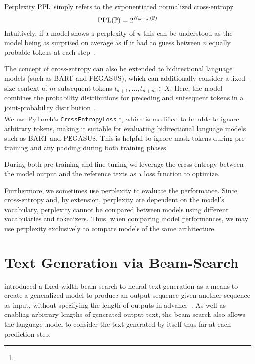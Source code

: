 Perplexity \(\operatorname{PPL}\) simply refers to the exponentiated normalized cross-entropy
\begin{equation}
\operatorname{PPL}(\mathbb{P}) = 2^{H_\text{norm.}(\mathbb{P})}
\end{equation}
Intuitively, if a model shows a perplexity of \(n\) this can be understood
as the model being as surprised on average as if it had
to guess between \(n\) equally probable tokens at each step~\parencite[78]{statistical_nlp}.

The concept of cross-entropy can also be extended to bidirectional language models (such as BART and PEGASUS),
which can additionally consider a fixed-size context of \(m\) subsequent tokens \(t_{n+1}, \ldots, t_{n+m} \in X\).
Here, the model combines the probability distributions for preceding and subsequent tokens in a joint-probability distribution~\parencites[3]{deep_bidirectional_lm}[1758]{bidirectional_lm}.\\
We use PyTorch's \verb+CrossEntropyLoss+%
\footnote{},
which is modified to be able to ignore arbitrary tokens,
making it suitable for evaluating bidirectional language models such as BART and PEGASUS.
This is helpful to ignore mask tokens during pre-training and any padding during both training phases.

During both pre-training and fine-tuning
we leverage the cross-entropy between the model output and the reference texts as a loss function to optimize.

Furthermore, we sometimes use perplexity to evaluate the performance.
Since cross-entropy and, by extension, perplexity are dependent on the model's vocabulary,
perplexity cannot be compared between models using different vocabularies and tokenizers.
Thus, when comparing model performances, we may use perplexity exclusively to
compare models of the same architecture.

\section{Text Generation via Beam-Search}\label{sec:beam_search}

\citeauthor*{beam_search} introduced a fixed-width beam-search to neural text generation
as a means to create a generalized model to produce an output sequence given another sequence as input, without specifying the length of outputs in advance~\parencite[11]{beam_search}.
As well as enabling arbitrary lengths of generated output text,
the beam-search also allows the language model to consider the text generated by itself thus far at each prediction step.

